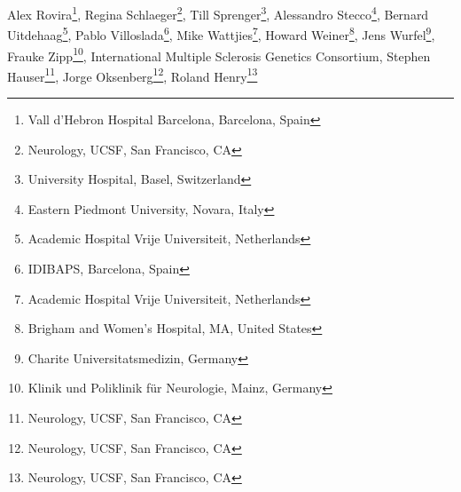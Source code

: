 Alex Rovira\footnote[5]{Vall d’Hebron Hospital Barcelona, Barcelona, Spain},
Regina Schlaeger\footnote[1]{Neurology, UCSF, San Francisco, CA},
Till Sprenger\footnote[13]{University Hospital, Basel, Switzerland},
Alessandro Stecco\footnote[6]{Eastern Piedmont University, Novara, Italy},
Bernard Uitdehaag\footnote[16]{Academic Hospital Vrije Universiteit, Netherlands},
Pablo Villoslada\footnote[14]{IDIBAPS, Barcelona, Spain},
Mike Wattjies\footnote[16]{Academic Hospital Vrije Universiteit, Netherlands},
Howard Weiner\footnote[4]{Brigham and Women's Hospital, MA, United States},
Jens Wurfel\footnote[2]{Charite Universitatsmedizin, Germany},
Frauke Zipp\footnote[10]{Klinik und Poliklinik für Neurologie, Mainz, Germany},
International Multiple Sclerosis Genetics Consortium,
Stephen Hauser\footnote[1]{Neurology, UCSF, San Francisco, CA},
Jorge Oksenberg\footnote[1]{Neurology, UCSF, San Francisco, CA},
Roland Henry\footnote[1]{Neurology, UCSF, San Francisco, CA}

\else %
\author[1]{Anisha Keshavan}
\author[2]{Friedmann Paul}
\author[3]{Mona Beyer}
\author[1]{Alyssa Zhu}
\author[1]{Nico Papinutto}
\author[1]{William Stern}
\author[13]{Michael Aman}
\author[4]{Rohit Bakshi}
\author[1]{Antje Bischof}
\author[5]{Manuel Comabella}
\author[1]{Jason Crane}
\author[6]{Sandra D’Alfonso}
\author[7]{Benedicte Dubois}
\author[8]{Massimo Filippi}
\author[9]{Bertrand Fontaine}
\author[7]{Ann Goris}
\author[13]{Laura Gaetano}
\author[10]{Sergiu Groppa}
\author[11]{David Hafler}
\author[3]{Hanne Harbo}
\author[12]{Bernhard Hemmer}
\author[1]{Kesshi Jordan}
\author[13]{Ludwig Kappos}
\author[1]{Gina Kirkish}
\author[14]{Sara Llufriu}
\author[13]{Stefano Magon}
\author[8]{Filippo Martinelli-Boneschi}
\author[15]{Jacob McCauley}
\author[5]{Xavier Montalban}
\author[12]{Mark Muhlau}
\author[11]{Daniel Pelletier} %
\author[15]{Margaret Pericak-Vance}
\author[9]{Isabelle Rebeix}
\author[8]{Maria Rocca}
\author[5]{Alex Rovira}
\author[1]{Regina Schlaeger}
\author[13]{Till Sprenger} %
\author[6]{Alessandro Stecco}
\author[16]{Bernard Uitdehaag}
\author[14]{Pablo Villoslada}
\author[13]{Mike Wattjies}
\author[4]{Howard Weiner}
\author[2]{Jens Wurfel}
\author[10]{Frauke Zipp}
\author[17]{International Multiple Sclerosis Genetics Consortium}
\author[1]{Stephen Hauser}
\author[1]{Jorge Oksenberg}
\author[1]{Roland Henry}

